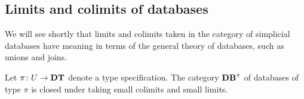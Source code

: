 \documentclass{amsart}
\def\DT{{\bf DT}}
\def\Data{{\bf DB}}
\begin{document}
\subsection{Limits and colimits of databases}

We will see shortly that limits and colimits taken in the category of simplicial databases have meaning in terms of the general theory of databases, such as unions and joins.  

\begin{theorem}\label{thm:colimits and limits}

Let $\pi\taking U\to\DT$ denote a type specification.  The category $\Data^\pi$ of databases of type $\pi$ is closed under taking small colimits and small limits.

\end{theorem}
\end{document}
